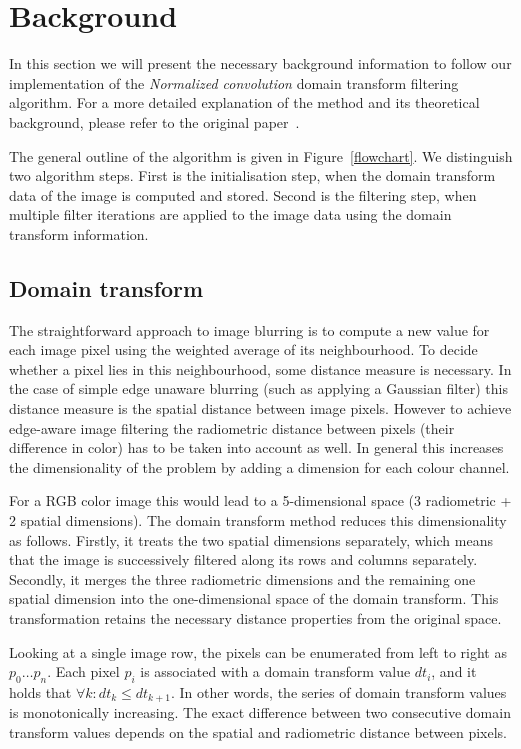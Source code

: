 \section{Background}\label{sec:background}

In this section we will present the necessary background information to follow our implementation of the \textit{Normalized convolution} domain transform filtering algorithm. For a more detailed explanation of the method and its theoretical background, please refer to the original paper~\cite{GastalOliveira2011DomainTransform}.

The general outline of the algorithm is given in Figure~\ref{flowchart}. We distinguish two algorithm steps. First is the initialisation step, when the domain transform data of the image is computed and stored. Second is the filtering step, when multiple filter iterations are applied to the image data using the domain transform information.

\subsection{Domain transform}
The straightforward approach to image blurring is to compute a new value for each image pixel using the weighted average of its neighbourhood. To decide whether a pixel lies in this neighbourhood, some distance measure is necessary. In the case of simple edge unaware blurring (such as applying a Gaussian filter) this distance measure is the spatial distance between image pixels. However to achieve edge-aware image filtering the radiometric distance between pixels (their difference in color) has to be taken into account as well. In general this increases the dimensionality of the problem by adding a dimension for each colour channel.

For a RGB color image this would lead to a 5-dimensional space (3 radiometric + 2 spatial dimensions). The domain transform method reduces this dimensionality as follows.
Firstly, it treats the two spatial dimensions separately, which means that the image is successively filtered along its rows and columns separately. Secondly, it merges the three radiometric dimensions and the remaining one spatial dimension into the one-dimensional space of the domain transform. This transformation retains the necessary distance properties from the original space.

Looking at a single image row, the pixels can be enumerated from left to right as $ p_0 \dots p_n$. Each pixel $p_i$ is associated with a domain transform value $dt_i$, and it holds that $\forall k : dt_k \leq dt_{k+1}$. In other words, the series of domain transform values is monotonically increasing. The exact difference between two consecutive domain transform values depends on the spatial and radiometric distance between pixels.

